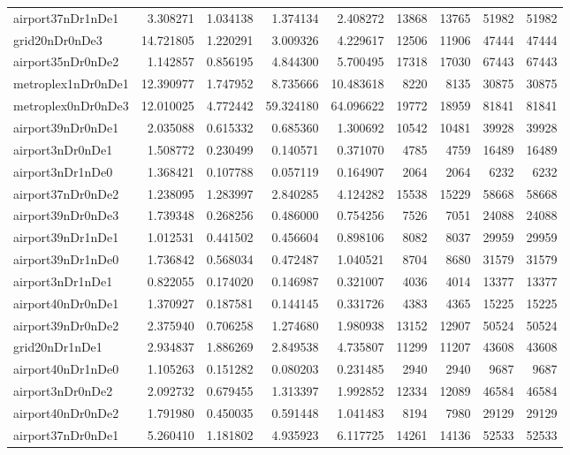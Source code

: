 \begin{longtable}{|l|r|r|r|r|r|r|r|r|}
airport37nDr1nDe1 & 3.308271 & 1.034138 & 1.374134 & 2.408272 & 13868 & 13765 & 51982 & 51982 \\
grid20nDr0nDe3 & 14.721805 & 1.220291 & 3.009326 & 4.229617 & 12506 & 11906 & 47444 & 47444 \\
airport35nDr0nDe2 & 1.142857 & 0.856195 & 4.844300 & 5.700495 & 17318 & 17030 & 67443 & 67443 \\
metroplex1nDr0nDe1 & 12.390977 & 1.747952 & 8.735666 & 10.483618 & 8220 & 8135 & 30875 & 30875 \\
metroplex0nDr0nDe3 & 12.010025 & 4.772442 & 59.324180 & 64.096622 & 19772 & 18959 & 81841 & 81841 \\
airport39nDr0nDe1 & 2.035088 & 0.615332 & 0.685360 & 1.300692 & 10542 & 10481 & 39928 & 39928 \\
airport3nDr0nDe1 & 1.508772 & 0.230499 & 0.140571 & 0.371070 & 4785 & 4759 & 16489 & 16489 \\
airport3nDr1nDe0 & 1.368421 & 0.107788 & 0.057119 & 0.164907 & 2064 & 2064 & 6232 & 6232 \\
airport37nDr0nDe2 & 1.238095 & 1.283997 & 2.840285 & 4.124282 & 15538 & 15229 & 58668 & 58668 \\
airport39nDr0nDe3 & 1.739348 & 0.268256 & 0.486000 & 0.754256 & 7526 & 7051 & 24088 & 24088 \\
airport39nDr1nDe1 & 1.012531 & 0.441502 & 0.456604 & 0.898106 & 8082 & 8037 & 29959 & 29959 \\
airport39nDr1nDe0 & 1.736842 & 0.568034 & 0.472487 & 1.040521 & 8704 & 8680 & 31579 & 31579 \\
airport3nDr1nDe1 & 0.822055 & 0.174020 & 0.146987 & 0.321007 & 4036 & 4014 & 13377 & 13377 \\
airport40nDr0nDe1 & 1.370927 & 0.187581 & 0.144145 & 0.331726 & 4383 & 4365 & 15225 & 15225 \\
airport39nDr0nDe2 & 2.375940 & 0.706258 & 1.274680 & 1.980938 & 13152 & 12907 & 50524 & 50524 \\
grid20nDr1nDe1 & 2.934837 & 1.886269 & 2.849538 & 4.735807 & 11299 & 11207 & 43608 & 43608 \\
airport40nDr1nDe0 & 1.105263 & 0.151282 & 0.080203 & 0.231485 & 2940 & 2940 & 9687 & 9687 \\
airport3nDr0nDe2 & 2.092732 & 0.679455 & 1.313397 & 1.992852 & 12334 & 12089 & 46584 & 46584 \\
airport40nDr0nDe2 & 1.791980 & 0.450035 & 0.591448 & 1.041483 & 8194 & 7980 & 29129 & 29129 \\
airport37nDr0nDe1 & 5.260410 & 1.181802 & 4.935923 & 6.117725 & 14261 & 14136 & 52533 & 52533 \\

\end{longtable}
